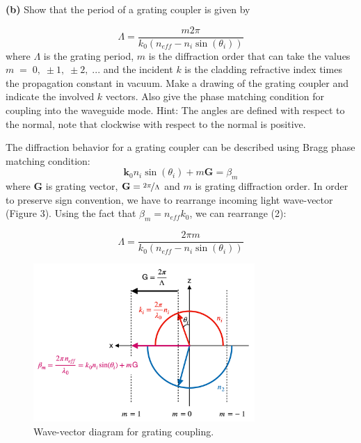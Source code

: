 \documentclass[11pt,a4paper]{article}
\begin{document}
\begin{displayquote}
    \textbf{(b)} Show that the period of a grating coupler is given by

    \begin{equation*}
        \Lambda=\frac{m2\pi}{k_0(n_{eff}-n_i\sin{(\theta_i)})}
    \end{equation*}
     where $\Lambda$ is the grating period, $m$ is the diffraction order that can take the values $m \; = \; 0, \; \pm1, \; \pm2 , \; ...$ and the incident $k$ is the cladding refractive index times the propagation constant in vacuum.
    Make a drawing of the grating coupler and indicate the involved $k$ vectors. Also give the phase matching condition for coupling into the waveguide mode.
    Hint: The angles are defined with respect to the normal, note that clockwise with respect to the normal is positive.
\end{displayquote}

The diffraction behavior for a grating coupler can be described using Bragg phase matching condition:
\begin{equation}
    \textbf{k}_0 n_i \sin{(\theta_i)} + m \textbf{G} = \beta_m
\end{equation}
where $\textbf{G}$ is grating vector, $\textbf{G}=\nicefrac{2\pi}{\Lambda}$ and $m$ is grating diffraction order. In order to preserve sign convention, we have to rearrange incoming light wave-vector (Figure 3). Using the fact that $\beta_m = n_{eff} k_0$, we can rearrange (2):

\begin{equation}
    \Lambda = \frac{2\pi m}{k_0 (n_{eff}-n_i \sin{(\theta_i)})}
\end{equation}

\begin{figure}[ht]
    \centering
    \includegraphics[width=0.75\textwidth]{fig_3.png}
    \caption{Wave-vector diagram for grating coupling.}
\end{figure}
\end{document}
